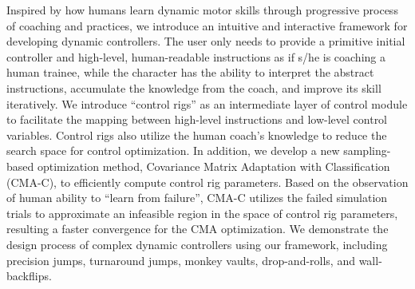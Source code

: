 Inspired by how humans learn dynamic motor skills through progressive
process of coaching and practices, we introduce an intuitive and
interactive framework for developing dynamic controllers. The user
only needs to provide 
a primitive initial controller and
high-level, human-readable instructions as if
s/he is coaching a human trainee, while the character has the ability
to interpret the abstract instructions, accumulate the knowledge from
the coach, and improve its skill iteratively. We introduce ``control
rigs'' as an intermediate layer of control module to facilitate the
mapping between high-level instructions and low-level control
variables. Control rigs also utilize the human coach's knowledge to
reduce the search space for control optimization. In addition, we
develop a new sampling-based optimization method, Covariance Matrix
Adaptation with Classification (CMA-C), to efficiently compute control
rig parameters. Based on the observation of human ability to ``learn
from failure'', CMA-C utilizes the failed simulation trials to
approximate an infeasible region in the space of control rig
parameters, resulting a faster convergence for the CMA
optimization. 
We demonstrate the design process of complex dynamic
controllers using our framework, including precision jumps, turnaround
jumps, monkey vaults, drop-and-rolls, and wall-backflips.
